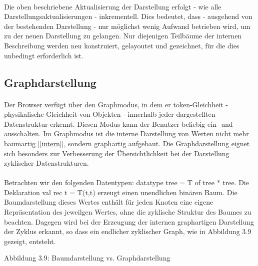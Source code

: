 \documentclass[12pt,a4paper]{article}
\begin{document}
\paragraph{}

Die oben beschriebene Aktualisierung der Darstellung erfolgt -
wie alle Darstellungsaktualisierungen - inkrementell. 
Dies bedeutet, dass - ausgehend  von der bestehenden Darstellung - 
nur m\"oglichst wenig Aufwand betrieben wird, um zu 
der neuen Darstellung zu gelangen. Nur diejenigen Teilb\"aume 
der internen Beschreibung werden neu konstruiert, gelayoutet und 
gezeichnet, f\"ur die dies unbedingt erforderlich ist. 


\subsection{Graphdarstellung}

\paragraph{}

Der Browser verf\"ugt \"uber den Graphmodus, in dem er token-Gleichheit -
physikalische Gleichheit von Objekten - innerhalb jeder dargestellten
Datenstruktur erkennt. Diesen Modus kann der Benutzer beliebig ein- und
ausschalten. Im Graphmodus ist die interne Darstellung von Werten 
nicht mehr baumartig [\ref{intern}], sondern graphartig aufgebaut.
Die Graphdarstellung eignet sich besonders zur Verbesserung der
\"Ubersichtlichkeit bei der Darstellung zyklischer Datenstrukturen. 

\paragraph{}

Betrachten wir den folgenden Datentypen: \newline
datatype tree = T of tree * tree. \newline
Die Deklaration \newline
 val rec t = T(t,t)  \newline
erzeugt einen unendlichen bin\"aren Baum. 
Die Baumdarstellung dieses Wertes 
enth\"alt f\"ur jeden Knoten  
eine eigene Repr\"asentation des jeweilgen Wertes, 
ohne die zyklische Struktur des Baumes zu beachten. 
Dagegen wird bei der Erzeugung der internen graphartigen
Darstellung der Zyklus erkannt, so dass ein endlicher zyklischer
Graph, wie in Abbildung 3.9 gezeigt, entsteht. 

\begin{center}
\linebreak 
Abbildung 3.9: Baumdarstellung vs. Graphdarstellung
\end{center}
\end{document}

